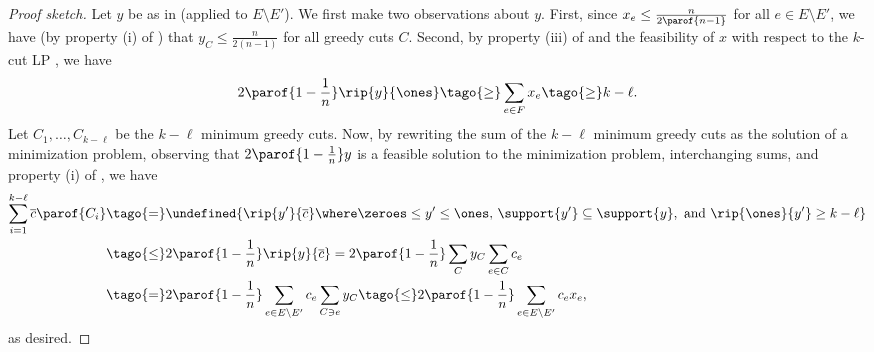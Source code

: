 \documentclass{toc}
\let\minof\undefined\usepackage{math} %
\newcommand{\costof}[1]{c_{#1}}
\providecommand{\sumcost}{\overline{c}\parof} %
\providecommand{\sumcostv}{\overline{c}} %
\newcommand{\wrt}{with respect to\xspace} %
\begin{document}
\bigskip

\begin{proof}[Proof sketch]
  Let $y$ be as in  (applied to $E \setminus
  E'$). We first make two observations about $y$. First, since
  \begin{math}
    x_e \leq \frac{n}{2 \parof{n-1}}
  \end{math}
  for all $e \in E \setminus E'$, we have (by property (i) of
  ) that
  \begin{math}
    y_C \leq \frac{n}{2(n-1)}
  \end{math}
  for all greedy cuts $C$. Second, by \tagr property (iii) of
   and \tagr the feasibility of $x$ \wrt the
  $k$-cut LP , we have
  \begin{align*}
    2 \parof{1 - \frac{1}{n}}\rip{y}{\ones}              %
    \tago{\geq}                    %
    \sum_{e \in F} x_e          %
    \tago{\geq}                 %
    k - \ell.
  \end{align*}
  Let $C_1,\dots,C_{k-\ell}$ be the $k-\ell$ minimum greedy cuts.
  Now, by \tagr rewriting the sum of the $k-\ell$ minimum greedy cuts
  as the solution of a minimization problem, \tagr observing that
  $2 \parof{1 - \frac{1}{n}} y$ is a feasible solution to the
  minimization problem, \tagr interchanging sums, and \tagr property
  (i) of , we have
  \begin{align*}
    \sum_{i=1}^{k-\ell} \sumcost{C_i} %
    &\tago{=}                                               %
      \minof{                                           %
      \rip{y'}{\sumcostv}                              %
      \where                                          %
      \zeroes \leq y' \leq \ones
      \text{, }                       %
      \support{y'} \subseteq \support{y},               %
      \text{ and }
      \rip{\ones}{y'} \geq k - \ell
      } \\
    &\tago{\leq}                       %
      2 \parof{1 - \frac{1}{n}}\rip{y}{\sumcostv} %
      =                         %
      2 \parof{1 - \frac{1}{n}} \sum_C y_C \sum_{e \in C} \costof{e} %
    \\
    &\tago{=}
      2 \parof{1 - \frac{1}{n}} \sum_{e \in E \setminus E'} \costof{e} \sum_{C \ni e} y_C %
      \tago{\leq}                                 %
      2 \parof{1 - \frac{1}{n}} \sum_{e \in E \setminus E'} c_e x_e,
  \end{align*}
  as desired.
\end{proof}
\end{document}
